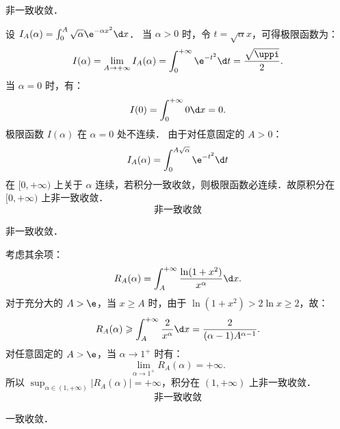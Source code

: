 \begin{solution}
     非一致收敛．

    设 $I_A(\alpha) = \int_0^A \sqrt{\alpha} \e^{-\alpha x^2} \d x$．
    当 $\alpha > 0$ 时，令 $t = \sqrt{\alpha} x$，可得极限函数为：
    \begin{equation}
        I(\alpha) = \lim_{A \to +\infty} I_A(\alpha) = \int_0^{+\infty} \e^{-t^2} \d t = \frac{\sqrt{\uppi}}{2}.
    \end{equation}
    当 $\alpha = 0$ 时，有：
    \begin{equation}
        I(0) = \int_0^{+\infty} 0 \d x = 0.
    \end{equation}
    极限函数 $I(\alpha)$ 在 $\alpha = 0$ 处不连续．
    由于对任意固定的 $A > 0$：
    \begin{equation}
        I_A(\alpha) = \int_0^{A\sqrt{\alpha}} \e^{-t^2} \d t
    \end{equation}
    在 $[0, +\infty)$ 上关于 $\alpha$ 连续，若积分一致收敛，则极限函数必连续．故原积分在 $[0, +\infty)$ 上非一致收敛．
    \begin{equation}
        \boxed{\text{非一致收敛}}
    \end{equation}

     非一致收敛．

    考虑其余项：
    \begin{equation}
        R_A(\alpha) = \int_A^{+\infty} \frac{\ln(1+x^2)}{x^\alpha} \d x.
    \end{equation}
    对于充分大的 $A > \e$，当 $x \geqslant A$ 时，由于 $\ln(1+x^2) > 2\ln x \geqslant 2$，故：
    \begin{equation}
        R_A(\alpha) \geqslant \int_A^{+\infty} \frac{2}{x^\alpha} \d x = \frac{2}{(\alpha-1)A^{\alpha-1}}.
    \end{equation}
    对任意固定的 $A > \e$，当 $\alpha \to 1^+$ 时有：
    \begin{equation}
        \lim_{\alpha \to 1^+} R_A(\alpha) = +\infty.
    \end{equation}
    所以 $\sup_{\alpha \in (1, +\infty)} |R_A(\alpha)| = +\infty$，积分在 $(1, +\infty)$ 上非一致收敛．
    \begin{equation}
        \boxed{\text{非一致收敛}}
    \end{equation}

     一致收敛．


\end{solution}
